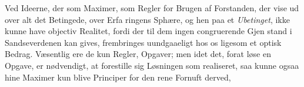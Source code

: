 \documentclass[12pt,a4paper]{book}
\begin{document}
Ved Ideerne, der som Maximer, som Regler for Brugen
af Forstanden, der vise ud over alt det Betingede, over Erfa\-%
ringens Sphære, og hen paa et \emph{Ubetinget}, ikke kunne have
objectiv Realitet, fordi der til dem ingen congruerende Gjen\-%
stand i Sandseverdenen kan gives, frembringes uundgaaeligt
hos os ligesom et optisk Bedrag. Væsentlig ere de kun Regler,
Opgaver; men idet det, forat løse en Opgave, er nødvendigt,
at forestille sig Løsningen som realiseret, saa kunne ogsaa
hine Maximer kun blive Principer for den rene Fornuft derved,
\end{document}
